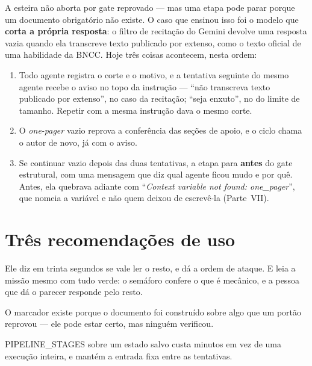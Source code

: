 \documentclass[11pt,a4paper]{article}
\newcommand{\cod}[1]{{\ttfamily\small #1}}
\begin{document}
A esteira não aborta por gate reprovado --- mas uma etapa pode parar porque um documento obrigatório não existe. O caso que ensinou isso foi o modelo que \textbf{corta a própria resposta}: o filtro de recitação do Gemini devolve uma resposta vazia quando ela transcreve texto publicado por extenso, como o texto oficial de uma habilidade da BNCC. Hoje três coisas acontecem, nesta ordem:

\begin{enumerate}
  \item Todo agente registra o corte e o motivo, e a tentativa seguinte do mesmo agente recebe o aviso no topo da instrução --- ``não transcreva texto publicado por extenso'', no caso da recitação; ``seja enxuto'', no do limite de tamanho. Repetir com a mesma instrução dava o mesmo corte.
  \item O \emph{one-pager} vazio reprova a conferência das seções de apoio, e o ciclo chama o autor de novo, já com o aviso.
  \item Se continuar vazio depois das duas tentativas, a etapa para \textbf{antes} do gate estrutural, com uma mensagem que diz qual agente ficou mudo e por quê. Antes, ela quebrava adiante com ``\emph{Context variable not found: one\_pager}'', que nomeia a variável e não quem deixou de escrevê-la (Parte~VII).
\end{enumerate}

\section{Três recomendações de uso}

\begin{description}[leftmargin=1.2cm,style=nextline,font=\sffamily\bfseries\color{unNavy}]
  \item[Comece pelo diagnóstico, não pelo PRD.] Ele diz em trinta segundos se vale ler o resto, e dá a ordem de ataque. E leia a missão mesmo com tudo verde: o semáforo confere o que é mecânico, e a pessoa que dá o parecer responde pelo resto.
  \item[Trate \cod{[PROVISÓRIO]} como rascunho, nunca como entrega.] O marcador existe porque o documento foi construído sobre algo que um portão reprovou --- ele pode estar certo, mas ninguém verificou.
  \item[Rode uma etapa isolada quando estiver iterando.] \cod{PIPELINE\_STAGES} sobre um estado salvo custa minutos em vez de uma execução inteira, e mantém a entrada fixa entre as tentativas.
\end{description}
\end{document}
